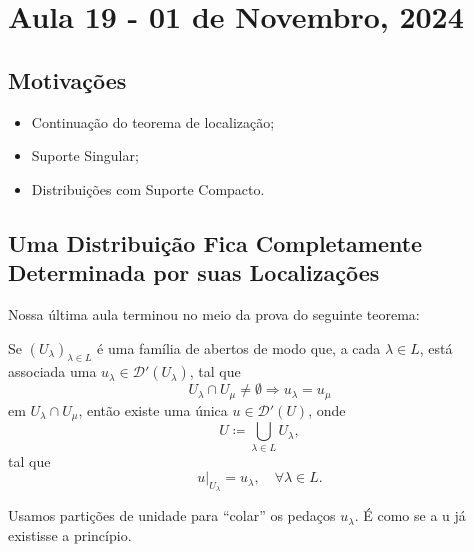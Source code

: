 \documentclass[../distribution_theory_notes.tex]{subfiles}
\begin{document}
\section{Aula 19 - 01 de Novembro, 2024}
\subsection{Motivações}
\begin{itemize}
	\item Continuação do teorema de localização;
	\item Suporte Singular;
	\item Distribuições com Suporte Compacto.
\end{itemize}

\subsection{Uma Distribuição Fica Completamente Determinada por suas Localizações}
Nossa última aula terminou no meio da prova do seguinte teorema:
\begin{theorem*}
	Se \((U_{\lambda })_{\lambda \in L}\) é uma família de abertos de modo que, a cada \(\lambda \in L\), está associada uma \(u_{\lambda }\in \mathcal{D}'(U_{\lambda })\), tal que
	\[
		U_{\lambda }\cap U_{\mu }\neq \emptyset \Rightarrow u_{\lambda }=u_{\mu }
	\]
	em \(U_{\lambda }\cap U_{\mu }\), então existe uma única \(u\in \mathcal{D}'(U)\), onde
	\[
		U\coloneqq \bigcup_{\lambda \in L}U_{\lambda },
	\]
	tal que
	\[
		u|_{U_{\lambda }}=u_{\lambda },\quad \forall \lambda \in L.
	\]
\end{theorem*}

\begin{tcolorbox}[
		skin=enhanced,
		title=Observação,
		fonttitle=\bfseries,
		colframe=black,
		colbacktitle=cyan!75!white,
		colback=cyan!15,
		colbacklower=black,
		coltitle=black,
		drop fuzzy shadow,
	]
	Usamos partições de unidade para ``colar'' os pedaços \(u_{\lambda }\). É como se a u já existisse a princípio.
\end{tcolorbox}
\end{document}
